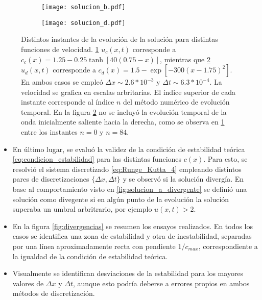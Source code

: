 \documentclass[aps,prb,twocolumn,superscriptaddress,floatfix,longbibliography,10pt]{revtex4-2}
\newcounter{para}
\begin{document}
\begin{figure}
  \centering
  \begin{subfigure}[b]{0.45\textwidth}
    \centering
    \texttt{[image: solucion\_b.pdf]}
    \caption{\label{fig:solucion_b}}
  \end{subfigure}
  \begin{subfigure}[b]{0.45\textwidth}
    \centering
    \texttt{[image: solucion\_d.pdf]}
    \caption{\label{fig:solucion_d}}
  \end{subfigure}
    \caption{Distintos instantes de la evolución de la solución para distintas funciones de velocidad. \ref{fig:solucion_b} $u_c(x,t)$ corresponde a $c_c(x) = 1.25 -0.25 \tanh{[40(0.75-x)]}$, mientras que \ref{fig:solucion_d} $u_d(x,t)$ corresponde a $c_d(x) = 1.5 - \exp{[-300(x-1.75)^2]}$. En ambos casos se empleó $\Delta x \sim 2.6*10^{-3}$ y $\Delta t \sim 6.3*10^{-4}$. La velocidad se grafica en escalas arbritarias. El índice superior de cada instante corresponde al índice $n$ del método numérico de evolución temporal. En la figura \ref{fig:solucion_d} no se incluyó la evolución temporal de la onda inicialmente saliente hacia la derecha, como se observa en \ref{fig:solucion_b} entre los instantes $n=0$ y $n=84$.}
    \label{fig:soluciones_b_y_d}
\end{figure}




\begin{itemize}
  \item En último lugar, se evaluó la validez de la condición de estabilidad teórica \ref{eq:condicion_estabilidad} para las distintas funciones $c(x)$. Para esto, se resolvió el sistema discretizado \ref{eq:Runge_Kutta_4} empleando distintos pares de discretizaciones $\{ \Delta x, \Delta t \}$ y se observó si la solución divergía. En base al comportamiento visto en \ref{fig:solucion_a_divergente} se definió una solución como divegente si en algún punto de la evolución la solución superaba un umbral arbritrario, por ejemplo $u(x,t) > 2$.
  \item En la figura \ref{fig:divergencias} se resumen los ensayos realizados. En todos los casos se identifica una zona de estabilidad y otra de inestabilidad, separadas por una línea aproximadamente recta con pendiente $1/c_{max}$, correspondiente a la igualdad de la condición de estabilidad teórica.
  \item Visualmente se identifican desviaciones de la estabilidad para los mayores valores de $\Delta x$ y $\Delta t$, aunque esto podría deberse a errores propios en ambos métodos de discretización.
\end{itemize}
\end{document}

